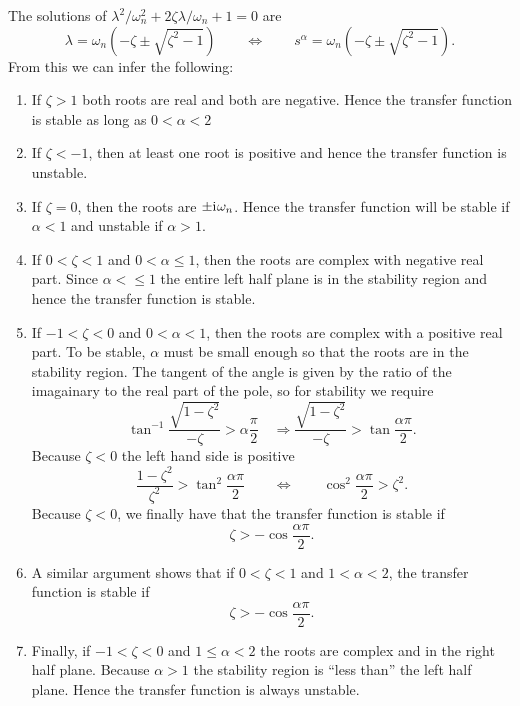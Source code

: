 The solutions of $\lambda^2/\omega_n^2 + 2 \zeta \lambda/\omega_n + 1 = 0$ are
\begin{equation*}
  \lambda = \omega_n \left( -\zeta \pm \sqrt{\zeta^2-1} \right) \qquad \Longleftrightarrow \qquad
  s^\alpha =  \omega_n \left( -\zeta \pm \sqrt{\zeta^2-1} \right).   
\end{equation*}
From this we can infer the following:
\begin{enumerate}
  \item If $\zeta > 1$ both roots are real and both are negative. Hence the transfer function is stable as long as $0 < \alpha < 2$
  \item  If $\zeta < -1$, then at least one root is positive and hence the transfer function is unstable.
  \item If $\zeta = 0$, then the roots are $\pm \mathrm{i}\mkern1mu \omega_n$. Hence the transfer function will be stable if $\alpha < 1$ and unstable if $\alpha > 1$. 
  \item If $0 < \zeta < 1$ and $0 < \alpha \leq 1$, then the roots are complex with negative real part. Since $\alpha < \leq 1$ the entire left half plane is in the stability region and hence the transfer function is stable.
  \item If $-1 < \zeta < 0$ and $0 < \alpha < 1$, then the roots are complex with a positive real part. To be stable, $\alpha$ must be small enough so that the roots are in the stability region. The tangent of the angle is given by the ratio of the imagainary to the real part of the pole, so for stability we require 
    \begin{equation*}
      \tan^{-1} \frac{\sqrt{1 - \zeta^2}}{-\zeta} > \alpha \frac{\pi}{2} \quad \Longrightarrow 
      \frac{\sqrt{1 - \zeta^2}}{-\zeta} > \tan \frac{\alpha \pi}{2}.
    \end{equation*}
    Because $\zeta < 0$ the left hand side is positive 
    \begin{equation*}
      \frac{1 - \zeta^2}{\zeta^2} > \tan^2 \frac{\alpha \pi}{2} \qquad \Longleftrightarrow \qquad
      \cos^2 \frac{\alpha \pi}{2} > \zeta^2.
    \end{equation*}
    Because $\zeta < 0$, we finally have that the transfer function is stable if
    \begin{equation*}
      \zeta > -\cos \frac{\alpha \pi}{2}.
    \end{equation*}
  \item A similar argument shows that if $0 < \zeta < 1$ and $1 < \alpha < 2$, the transfer function is stable if 
    \begin{equation*}
      \zeta > -\cos \frac{\alpha \pi}{2}.
    \end{equation*}
  \item Finally, if $-1 < \zeta < 0$ and $1 \leq \alpha < 2$ the roots are complex and in the right half plane. Because $\alpha > 1$ the stability region is ``less than'' the left half plane. Hence the transfer function is always unstable.
\end{enumerate}

